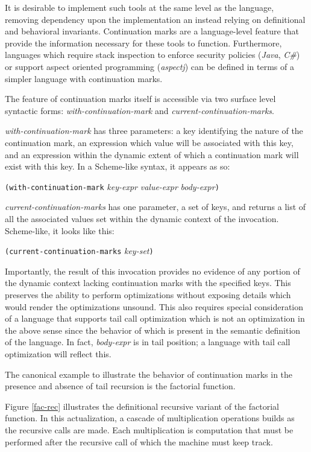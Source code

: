 \documentclass[ms]{byuprop}
\newcounter{definition}
\newcounter{example}
\begin{document}
It is desirable to implement such tools at the same level as the language, removing
dependency upon the implementation an instead relying on definitional and behavioral
invariants. Continuation marks are a language-level feature that provide the information
necessary for these tools to function. Furthermore, languages which require stack
inspection to enforce security policies (\emph{Java}, \emph{C\#}) or support aspect
oriented programming (\emph{aspectj}) can be defined in terms of a simpler language with
continuation marks.

The feature of continuation marks itself is accessible via two surface level syntactic
forms: \emph{with-continuation-mark} and \emph{current-continuation-marks}.

\emph{with-continuation-mark} has three parameters: a key identifying the nature of the
continuation mark, an expression which value will be associated with this key, and an
expression within the dynamic extent of which a continuation mark will exist with this
key. In a Scheme-like syntax, it appears as so:

\texttt{(with-continuation-mark} \emph{key-expr} \emph{value-expr} \emph{body-expr}\texttt{)}

\emph{current-continuation-marks} has one parameter, a set of keys, and returns a list of
all the associated values set within the dynamic context of the invocation. Scheme-like,
it looks like this:


\texttt{(current-continuation-marks} \emph{key-set}\texttt{)}

Importantly, the result of this invocation provides no evidence of any portion of the
dynamic context lacking continuation marks with the specified keys. This preserves the
ability to perform optimizations without exposing details which would render the
optimizations unsound. This also requires special consideration of a language that
supports tail call optimization which is not an optimization in the above sense since the
behavior of which is present in the semantic definition of the language. In fact, 
\emph{body-expr} is in tail position; a language with tail call optimization will reflect 
this.

The canonical example to illustrate the behavior of continuation marks in the presence and
absence of tail recursion is the factorial function.

Figure \ref{fac-rec} illustrates the definitional recursive variant of the factorial
function. In this actualization, a cascade of multiplication operations builds as the
recursive calls are made. Each multiplication is computation that must be performed after
the recursive call of which the machine must keep track.
\end{document}
